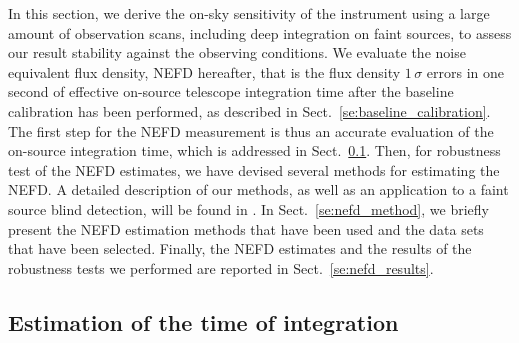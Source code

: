 
%

In this section, we derive the on-sky sensitivity of the instrument
using a large amount of observation scans, including deep integration
on faint sources, to assess our result stability against the observing
conditions. We evaluate the noise equivalent flux
density, NEFD hereafter, that is the flux density
$1\,\sigma$ errors in one second of effective
on-source telescope integration time after the baseline calibration
has been performed, as described in
Sect.~\ref{se:baseline_calibration}. The first step for
the NEFD measurement is thus an accurate evaluation of the on-source
integration time, which is addressed in
Sect.~\ref{se:integration_time}. Then, for robustness test of the NEFD
estimates, we have devised several methods for estimating the NEFD. A
detailed description of our methods, as well as an application to a
faint source blind detection, will be found in
\citet{Ponthieu2019}. In Sect.~\ref{se:nefd_method}, we briefly
present the NEFD estimation methods that have been used and the data
sets that have been selected. Finally, the NEFD estimates and the
results of the robustness tests we performed are reported in
Sect.~\ref{se:nefd_results}.


\subsection{Estimation of the time of integration}
\label{se:integration_time}

